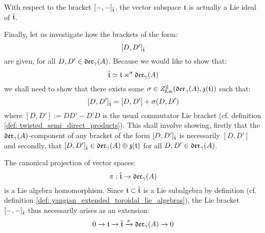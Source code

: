         \begin{corollary} \label{coro: toroidal_lie_algebras_are_ideals}
            With respect to the bracket $[-, -]_{\hat{\mathfrak{t}}}$, the vector subspace $\mathfrak{t}$ is actually a Lie ideal of $\hat{\mathfrak{t}}$.
        \end{corollary}

        Finally, let us investigate how the brackets of the form:
            $$[D, D']_{\hat{\mathfrak{t}}}$$
        are given, for all $D, D' \in \mathfrak{der}_{\gamma}(A)$. Because we would like to show that:
            $$\hat{\mathfrak{t}} \simeq \mathfrak{t} \rtimes^{\sigma} \mathfrak{der}_{\gamma}(A)$$
        we shall need to show that there exists some $\sigma \in Z^2_{\mathrm{Lie}}(\mathfrak{der}_{\gamma}(A), \mathfrak{z}(\mathfrak{t}))$ such that:
            $$[D, D']_{\hat{\mathfrak{t}}} = [D, D'] + \sigma(D, D')$$
        where $[D, D'] := DD' - D'D$ is the usual commutator Lie bracket (cf. definition \ref{def: twisted_semi_direct_products}). This shall involve showing, firstly that the $\mathfrak{der}_{\gamma}(A)$-component of any bracket of the form $[D, D']_{\hat{\mathfrak{t}}}$ is necessarily $[D, D']$ and secondly, that $[D, D']_{\hat{\mathfrak{t}}} \in \mathfrak{der}_{\gamma}(A) \oplus \mathfrak{z}(\mathfrak{t})$ for all $D, D' \in \mathfrak{der}_{\gamma}(A)$.
        \begin{lemma} \label{lemma: yangian_extended_toroidal_lie_algebras_are_extensions}
            The canonical projection of vector spaces:
                $$\pi: \hat{\mathfrak{t}} \to \mathfrak{der}_{\gamma}(A)$$
            is a Lie algebra homomorphism. Since $\mathfrak{t} \subset \hat{\mathfrak{t}}$ is a Lie subalgebra by definition (cf. definition \ref{def: yangian_extended_toroidal_lie_algebras}), the Lie bracket $[-, -]_{\hat{\mathfrak{t}}}$ thus necessarily arises as an extension:
                $$0 \to \mathfrak{t} \to \hat{\mathfrak{t}} \xrightarrow[]{\pi} \mathfrak{der}_{\gamma}(A) \to 0$$
        \end{lemma}
